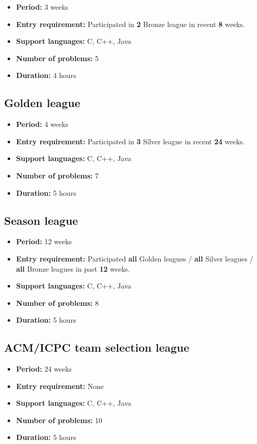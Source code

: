 \documentclass{article}
\begin{document}
\begin{itemize}
	\item \textbf{Period:} 3 weeks
	\item \textbf{Entry requirement:} Participated in \textbf{2} Bronze league in recent \textbf{8} weeks.
	\item \textbf{Support languages:} C, C++, Java
	\item \textbf{Number of problems:} 5
	\item \textbf{Duration:} 4 hours
\end{itemize}

\subsection{Golden league}

\begin{itemize}
	\item \textbf{Period:} 4 weeks
	\item \textbf{Entry requirement:} Participated in \textbf{3} Silver league in recent \textbf{24} weeks.
	\item \textbf{Support languages:} C, C++, Java
	\item \textbf{Number of problems:} 7
	\item \textbf{Duration:} 5 hours
\end{itemize}

\subsection{Season league}

\begin{itemize}
	\item \textbf{Period:} 12 weeks
	\item \textbf{Entry requirement:} Participated \textbf{all} Golden leagues / \textbf{all} Silver leagues / \textbf{all} Bronze leagues in past \textbf{12} weeks.
	\item \textbf{Support languages:} C, C++, Java
	\item \textbf{Number of problems:} 8
	\item \textbf{Duration:} 5 hours
\end{itemize}

\subsection{ACM/ICPC team selection league}

\begin{itemize}
	\item \textbf{Period:} 24 weeks
	\item \textbf{Entry requirement:} None
	\item \textbf{Support languages:} C, C++, Java
	\item \textbf{Number of problems:} 10
	\item \textbf{Duration:} 5 hours
\end{itemize}
\end{document}
